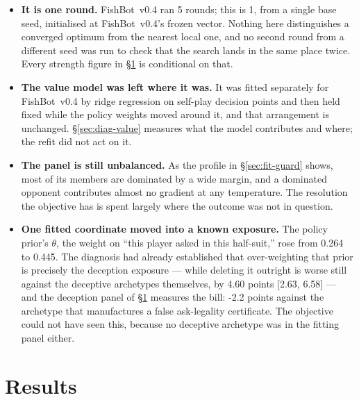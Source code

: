 \documentclass[11pt]{article}
\theoremstyle{definition}
\DeclareRobustCommand{\vfour}{\texorpdfstring{\mbox{FishBot v0.4}}{FishBot v0.4}}
\providecommand{\numDecFeintDelta}{-2.2}
\providecommand{\numPriorThetaFour}{0.264}
\providecommand{\numPriorThetaFive}{0.445}
\providecommand{\numFitRounds}{1}
\providecommand{\numVfourFitRounds}{5}
\providecommand{\numPriorDeleteCI}{2.63, 6.58}
\providecommand{\numPriorDeleteCost}{4.60}
\begin{document}
\begin{itemize}
  \item \textbf{It is one round.} \vfour{} ran \numVfourFitRounds{} rounds; this
        is \numFitRounds{}, from a single base seed, initialised at \vfour{}'s
        frozen vector. Nothing here distinguishes a converged optimum from the
        nearest local one, and no second round from a different seed was run to
        check that the search lands in the same place twice. Every strength
        figure in \S\ref{sec:results} is conditional on that.
  \item \textbf{The value model was left where it was.} It was fitted
        separately for \vfour{} by ridge regression on self-play decision points
        and then held fixed while the policy weights moved around it, and that
        arrangement is unchanged. \S\ref{sec:diag-value} measures what the model
        contributes and where; the refit did not act on it.
  \item \textbf{The panel is still unbalanced.} As the profile in
        \S\ref{sec:fit-guard} shows, most of its members are dominated by a wide
        margin, and a dominated opponent contributes almost no gradient at any
        temperature. The resolution the objective has is spent largely where the
        outcome was not in question.
  \item \textbf{One fitted coordinate moved into a known exposure.} The policy
        prior's $\theta$, the weight on ``this player asked in this half-suit,''
        rose from \numPriorThetaFour{} to \numPriorThetaFive{}. The diagnosis had
        already established that over-weighting that prior is precisely the
        deception exposure --- while deleting it outright is worse still against
        the deceptive archetypes themselves, by \numPriorDeleteCost{} points
        [\numPriorDeleteCI] --- and the deception panel of
        \S\ref{sec:results} measures the bill: \numDecFeintDelta{} points against
        the archetype that manufactures a false ask-legality certificate. The
        objective could not have seen this, because no deceptive archetype was in
        the fitting panel either.
\end{itemize}
\section{Results}
\label{sec:results}

\renewcommand{\topfraction}{0.92}
\renewcommand{\bottomfraction}{0.75}
\renewcommand{\textfraction}{0.06}
\renewcommand{\floatpagefraction}{0.80}
\setcounter{topnumber}{3}
\setcounter{bottomnumber}{2}
\setcounter{totalnumber}{4}
\setlength{\textfloatsep}{12pt plus 2pt minus 4pt}
\setlength{\floatsep}{10pt plus 2pt minus 3pt}
\setlength{\intextsep}{12pt plus 2pt minus 3pt}
\end{document}
